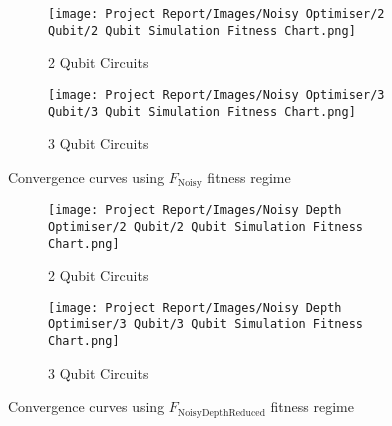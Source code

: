 \documentclass[11pt,a4paper]{article}
\begin{document}
\begin{figure}[H]
    \centering
    \begin{subfigure}{.5\textwidth}
        \centering
        \texttt{[image: Project Report/Images/Noisy Optimiser/2 Qubit/2 Qubit Simulation Fitness Chart.png]}
        \caption{2 Qubit Circuits}
        \label{fig:noisy_fitness_2q}
    \end{subfigure}%
    \begin{subfigure}{.5\textwidth}
        \centering
        \texttt{[image: Project Report/Images/Noisy Optimiser/3 Qubit/3 Qubit Simulation Fitness Chart.png]}
        \caption{3 Qubit Circuits}
        \label{fig:noisy_fitness_3q}
    \end{subfigure}
\caption{Convergence curves using $F_{\mathrm{Noisy}}$ fitness regime}
\label{fig:noisy_fitness_charts}
\end{figure}

\begin{figure}[H]
    \centering
    \begin{subfigure}{.5\textwidth}
        \centering
        \texttt{[image: Project Report/Images/Noisy Depth Optimiser/2 Qubit/2 Qubit Simulation Fitness Chart.png]}
        \caption{2 Qubit Circuits}
        \label{fig:noisy_depth_fitness_2q}
    \end{subfigure}%
    \begin{subfigure}{.5\textwidth}
        \centering
        \texttt{[image: Project Report/Images/Noisy Depth Optimiser/3 Qubit/3 Qubit Simulation Fitness Chart.png]}
        \caption{3 Qubit Circuits}
        \label{fig:noisy_depth_fitness_3q}
    \end{subfigure}
    \caption{Convergence curves using $F_{\mathrm{NoisyDepthReduced}}$ fitness regime}
    \label{fig:noisy_depth_fitness_charts}
\end{figure}
\end{document}

